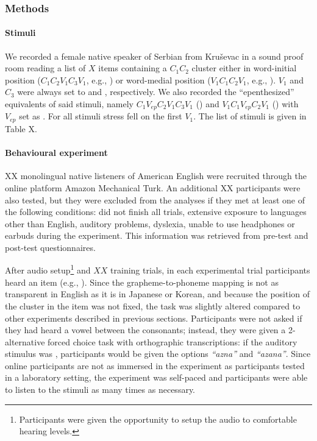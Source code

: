 {\subsubsection{Methods}
\paragraph{Stimuli}
We recorded a female native speaker of Serbian from Kruševac in a sound proof room reading a list of {\color{red}$X$} items containing a $C_{1}C_{2}$ cluster either in word-initial position ($C_{1}C_{2}V_{1}C_{3}V_{1}$, e.g., ) or word-medial position ($V_{1}C_{1}C_{2}V_{1}$, e.g., ). $V_{1}$ and $C_{3}$ were always set to  and , respectively. 
We also recorded the ``epenthesized'' equivalents of said stimuli, namely $C_{1}V_{ep}C_{2}V_{1}C_{3}V_{1}$ () and $V_{1}C_{1}V_{ep}C_{2}V_{1}$ () with $V_{ep}$ set as {\color{red}\textipa{[@]}}.
For all stimuli stress fell on the first $V_{1}$.
{\color{red}The list of stimuli is given in Table X.}

\paragraph{Behavioural experiment}
{\color{red}XX} monolingual native listeners of American English were recruited through the online platform Amazon Mechanical Turk. An additional {\color{red}XX participants were also tested, but they were excluded from the analyses if they met at least one of the following conditions: did not finish all trials, extensive exposure to languages other than English, auditory problems, dyslexia, unable to use headphones or earbuds during the experiment}. This information was retrieved from pre-test and post-test questionnaires.

After audio setup\footnote{Participants were given the opportunity to setup the audio to comfortable hearing levels.} and {\color{red}$XX$} training trials, in each experimental trial participants heard an item (e.g., ). Since the grapheme-to-phoneme mapping is not as transparent in English as it is in Japanese or Korean, and because the position of the cluster in the item was not fixed, the task was slightly altered compared to other experiments described in previous sections. Participants were not asked if they had heard a vowel between the consonants; instead, they were given a 2-alternative forced choice task with orthographic transcriptions: if the auditory stimulus was , participants would be given the options \textit{``azna''} and  \textit{``azana''}. Since online participants are not as immersed in the experiment as participants tested in a laboratory setting, the experiment was self-paced and participants were able to listen to the stimuli as many times as necessary.

}
